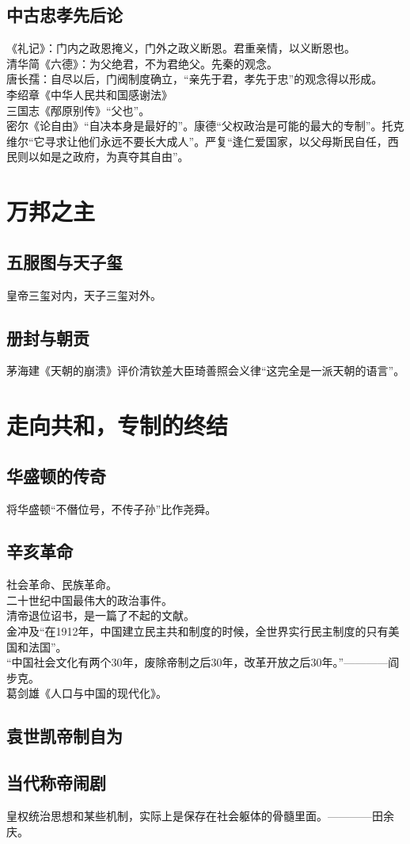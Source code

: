 \documentclass[twoside]{article}
\begin{document}
\subsection{中古忠孝先后论}
《礼记》：门内之政恩掩义，门外之政义断恩。君重亲情，以义断恩也。\\
清华简《六德》：为父绝君，不为君绝父。先秦的观念。\\
唐长孺：自尽以后，门阀制度确立，``亲先于君，孝先于忠''的观念得以形成。\\
李绍章《中华人民共和国感谢法》\\
三国志《邴原别传》``父也''。\\
密尔《论自由》``自决本身是最好的''。康德``父权政治是可能的最大的专制''。托克维尔``它寻求让他们永远不要长大成人''。严复``逢仁爱国家，以父母斯民自任，西民则以如是之政府，为真夺其自由''。\\
\section{万邦之主}
\subsection{五服图与天子玺}
皇帝三玺对内，天子三玺对外。\\
\subsection{册封与朝贡}
茅海建《天朝的崩溃》评价清钦差大臣琦善照会义律``这完全是一派天朝的语言''。\\
\section{走向共和，专制的终结}
\subsection{华盛顿的传奇}
将华盛顿``不僭位号，不传子孙''比作尧舜。\\
\subsection{辛亥革命}
社会革命、民族革命。\\
二十世纪中国最伟大的政治事件。\\
清帝退位诏书，是一篇了不起的文献。\\
金冲及``在1912年，中国建立民主共和制度的时候，全世界实行民主制度的只有美国和法国''。\\
``中国社会文化有两个30年，废除帝制之后30年，改革开放之后30年。''————阎步克。\\
葛剑雄《人口与中国的现代化》。\\
\subsection{袁世凯帝制自为}
\subsection{当代称帝闹剧}
皇权统治思想和某些机制，实际上是保存在社会躯体的骨髓里面。————田余庆。
\end{document}
